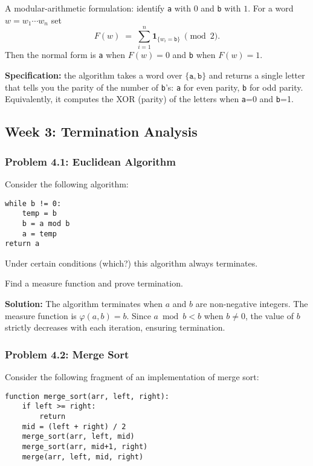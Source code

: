 \documentclass{article}
\theoremstyle{plain}
\theoremstyle{definition}
\theoremstyle{remark}
\begin{document}
\begin{enumerate}[label=(\alph*)]
  A modular-arithmetic formulation: identify \texttt{a} with $0$ and \texttt{b} with $1$. For a word $w=w_1\cdots w_n$ set
  \[
    F(w)\;=\;\sum_{i=1}^n \mathbf{1}_{\{w_i=\texttt{b}\}}\ \pmod{2}.
  \]
  Then the normal form is \texttt{a} when $F(w)=0$ and \texttt{b} when $F(w)=1$.
  
  \textbf{Specification:} the algorithm takes a word over $\{\texttt{a},\texttt{b}\}$ and returns a single letter that tells you the parity of the number of \texttt{b}'s: \texttt{a} for even parity, \texttt{b} for odd parity. Equivalently, it computes the XOR (parity) of the letters when \texttt{a}=0 and \texttt{b}=1.
\end{enumerate}

\subsection{Week 3: Termination Analysis}

\subsubsection{Problem 4.1: Euclidean Algorithm}

Consider the following algorithm:

\begin{verbatim}
while b != 0:
    temp = b
    b = a mod b
    a = temp
return a
\end{verbatim}

Under certain conditions (which?) this algorithm always terminates.  

Find a measure function and prove termination.

\textbf{Solution:} The algorithm terminates when $a$ and $b$ are non-negative integers. The measure function is $\varphi(a,b) = b$. Since $a \bmod b < b$ when $b \neq 0$, the value of $b$ strictly decreases with each iteration, ensuring termination.

\subsubsection{Problem 4.2: Merge Sort}

Consider the following fragment of an implementation of merge sort:

\begin{verbatim}
function merge_sort(arr, left, right):
    if left >= right:
        return
    mid = (left + right) / 2
    merge_sort(arr, left, mid)
    merge_sort(arr, mid+1, right)
    merge(arr, left, mid, right)
\end{verbatim}
\end{document}
